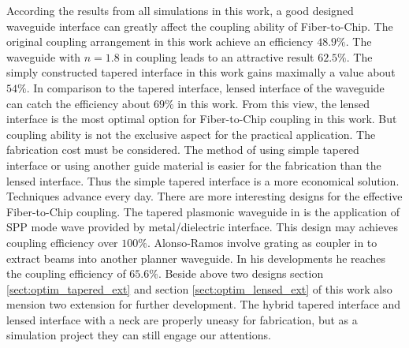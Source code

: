 According the results from all simulations in this work, a good designed waveguide interface can greatly affect the coupling ability of Fiber-to-Chip. The original coupling arrangement in this work achieve an efficiency $48.9\%$. The waveguide with $n=1.8$ in coupling leads to an attractive result $62.5\%$. The simply constructed tapered interface in this work gains maximally a value about $54\%$. In comparison to the tapered interface, lensed interface of the waveguide can catch the efficiency about $69\%$ in this work. From this view, the lensed interface is the most optimal option for Fiber-to-Chip coupling in this work. But coupling ability is not the exclusive aspect for the practical application. The fabrication cost must be considered. The method of using simple tapered interface or using another guide material is easier for the fabrication than the lensed interface. Thus the simple tapered interface is a more economical solution. \\
       
Techniques advance every day. There are more interesting designs for the effective Fiber-to-Chip coupling. The tapered plasmonic waveguide in \cite{tapered_plasmonic_waveguides} is the application of SPP mode wave provided by metal/dielectric interface. This design may achieves coupling efficiency over $100\%$. Alonso-Ramos involve grating as coupler in \cite{fiber_to_chip_grating_waveguides}  to extract beams into another planner waveguide. In his developments he reaches the coupling efficiency of $65.6\%$. Beside above two designs section \ref{sect:optim_tapered_ext} and section \ref{sect:optim_lensed_ext} of this work also mension two extension for further development. The hybrid tapered interface and lensed interface with a neck are properly uneasy for fabrication, but as a simulation project they can still engage our attentions.
